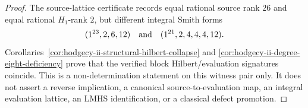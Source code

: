 \begin{proof}
The source-lattice certificate records equal rational source rank
\(26\) and equal rational \(H_1\)-rank \(2\), but different integral
Smith forms
\[
  (1^{23},2,6,12)
  \quad\hbox{and}\quad
  (1^{21},2,4,4,4,12).
\]
Corollaries~\ref{cor:hodgecy-ii-structural-hilbert-collapse} and
\ref{cor:hodgecy-ii-degree-eight-deficiency} prove that the verified
block Hilbert/evaluation signatures coincide.  This is a
non-determination statement on this witness pair only.  It does not
assert a reverse implication, a canonical source-to-evaluation map, an
integral evaluation lattice, an LMHS identification, or a classical
defect promotion.
\end{proof}
